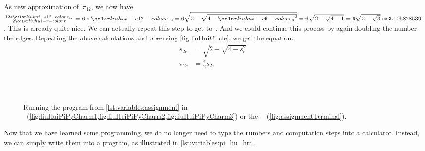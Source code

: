 As new approximation of~$\pi_{12}$, we now have $\frac{12*\liuhuist}{2\liuhuir}=6*\liuhuist=6\sqrt{2-\sqrt{4-\liuhuiss^2}}=6\sqrt{2-\sqrt{4-1}}=6\sqrt{2-\sqrt{3}}\approx 3.105828539$.
This is already quite nice.
We can actually repeat this step to get to~\liuhuistf.
And we could continue this process by again doubling the number the edges.
Repeating the above calculations and observing \cref{fig:liuHuiCircle}, we get the equation:%
%
\begin{align}%
s_{2e} &= \sqrt{2-\sqrt{4-s_e^2}}\label{eq:liuhui:sidelength}\\%
\pi_{2e} &= \frac{e}{2} s_{2e}\label{eq:liuhui:approx}%
\end{align}%
%
%
%
%
\begin{figure}[tb]%
\centering%
%
%
\hfill%
%
%
\\%
%
%
\\%
%
%
%
\caption{Running the program  from \cref{lst:variables:assignment} in \pycharm~(\cref{fig:liuHuiPiPyCharm1,fig:liuHuiPiPyCharm2,fig:liuHuiPiPyCharm3}) or the \ubuntu\ ~(\cref{fig:assignmentTerminal}).}%
\label{fig:variables:liuHuiPi}%
\end{figure}%
%
Now that we have learned some programming, we do no longer need to type the numbers and computation steps into a calculator.
Instead, we can simply write them into a program, as illustrated in \cref{lst:variables:pi_liu_hui}.
